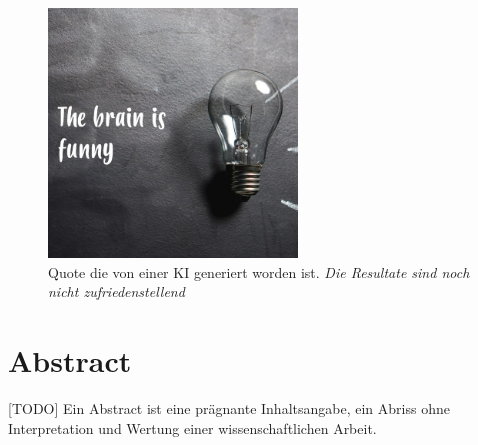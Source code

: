 \documentclass{thesisclass}
\begin{document}



\frontmatter
{}

\blankpage

\blankpage

\vspace*{\fill}
\begin{figure}[h]
  \center
  \includegraphics[width=250px]{images/inspirobotQuote.jpg}
  \caption{Quote die von einer \gls{KI} generiert worden ist. \textit{Die Resultate sind noch nicht zufriedenstellend} \cite{inspirobot}}
  \label{fig:Inspirational quote by AI}
\end{figure}
\vspace*{\fill}\clearpage

\tableofcontents
\cleardoublepage

%




\chapter{Abstract}
[TODO] Ein Abstract ist eine prägnante Inhaltsangabe, ein Abriss ohne Interpretation und Wertung einer wissenschaftlichen Arbeit.
\newpage
\end{document}
